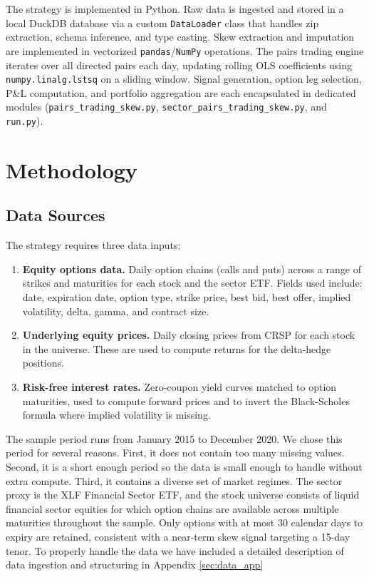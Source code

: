 \documentclass[12pt, a4paper]{article}
\begin{document}
The strategy is implemented in Python. Raw data is ingested and stored in a local DuckDB database via a custom \texttt{DataLoader} class that handles zip extraction, schema inference, and type casting. Skew extraction and imputation are implemented in vectorized \texttt{pandas}/\texttt{NumPy} operations. The pairs trading engine iterates over all directed pairs each day, updating rolling OLS coefficients using \texttt{numpy.linalg.lstsq} on a sliding window. Signal generation, option leg selection, P\&L computation, and portfolio aggregation are each encapsulated in dedicated modules (\texttt{pairs\_trading\_skew.py}, \texttt{sector\_pairs\_trading\_skew.py}, and \texttt{run.py}).




\section{Methodology}
\label{sec:methodology}

\subsection{Data Sources}
\label{sec:data}

The strategy requires three data inputs:

\begin{enumerate}
    \item \textbf{Equity options data.} Daily option chains (calls and puts) across a range of strikes and maturities for each stock and the sector ETF. Fields used include: date, expiration date, option type, strike price, best bid, best offer, implied volatility, delta, gamma, and contract size.

    \item \textbf{Underlying equity prices.} Daily closing prices from CRSP for each stock in the universe. These are used to compute returns for the delta-hedge positions.

    \item \textbf{Risk-free interest rates.} Zero-coupon yield curves matched to option maturities, used to compute forward prices and to invert the Black-Scholes formula where implied volatility is missing.
\end{enumerate}

The sample period runs from January 2015 to December 2020. We chose this period for several reasons. First, it does not contain too many missing values. Second, it is a short enough period so the data is small enough to handle without extra compute. Third, it contains a diverse set of market regimes. The sector proxy is the XLF Financial Sector ETF, and the stock universe consists of liquid financial sector equities for which option chains are available across multiple maturities throughout the sample. Only options with at most 30 calendar days to expiry are retained, consistent with a near-term skew signal targeting a 15-day tenor. To properly handle the data we have included a detailed description of data ingestion and structuring in Appendix \ref{sec:data_app}
\end{document}
